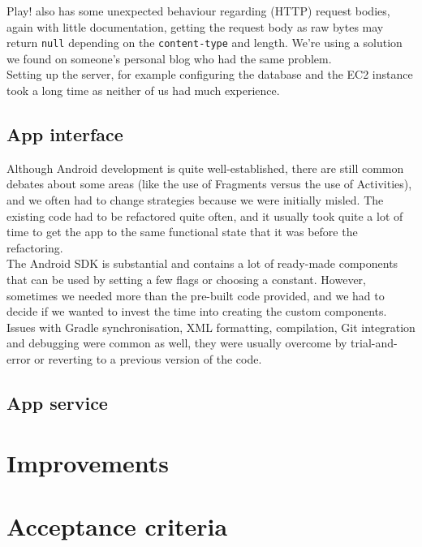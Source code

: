 \documentclass[a4paper,10pt]{article}
\begin{document}
Play! also has some unexpected behaviour regarding (HTTP) request bodies, again with little documentation, getting the
request body as raw bytes may return \texttt{null} depending on the \texttt{content-type} and length.
We're using a solution we found on someone's personal blog who had the same problem.\\

Setting up the server, for example configuring the database and the EC2 instance took a long time
as neither of us had much experience.

\subsection{App interface}
Although Android development is quite well-established, there are still common debates about some areas (like the use of Fragments versus the use of Activities), and we often had to change strategies because we were initially misled. The existing code had to be refactored quite often, and it usually took quite a lot of time to get the app to the same functional state that it was before the refactoring. \\

The Android SDK is substantial and contains a lot of ready-made components that can be used by setting a few flags or choosing a constant. However, sometimes we needed more than the pre-built code provided, and we had to decide if we wanted to invest the time into creating the custom components.\\

Issues with Gradle synchronisation, XML formatting, compilation, Git integration and debugging were common as well, they were usually overcome by trial-and-error or reverting to a previous version of the code.

\subsection{App service}



\section{Improvements}
\section{Acceptance criteria}
\end{document}
